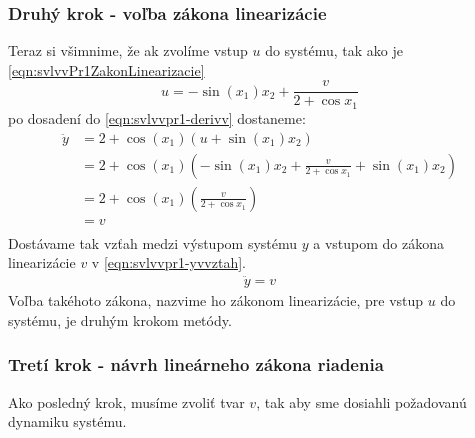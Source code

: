 \documentclass[../main.tex]{subfiles}
\begin{document}
    \subsubsection{Druhý krok - voľba zákona linearizácie}
	Teraz si všimnime, že ak zvolíme vstup $u$ do systému, tak ako je \cref{eqn:svlvvPr1ZakonLinearizacie} 
	\begin{equation}
	    u = -\sin(x_1) x_2  +  \frac{v}{2 + \cos x_1}
	    \label{eqn:svlvvPr1ZakonLinearizacie}
	\end{equation}
po dosadení do \cref{eqn:svlvvpr1-derivv} dostaneme:%
	\begin{equation*}
	\begin{aligned}
	 	\ddot{y} &= 2 + \cos(x_1)(u + \sin(x_1) x_2) \\
	 		     &= 2 + \cos(x_1)(-\sin(x_1) x_2  +  \frac{v}{2 + \cos x_1} + \sin(x_1) x_2)  \\ 
	 		     &= 2 + \cos(x_1)(\frac{v}{2 + \cos x_1})  \\ 
	 		     &= v  \\ 
 	\end{aligned}
	\end{equation*}
    Dostávame tak vzťah medzi výstupom systému $y$ a vstupom do zákona linearizácie $v$ v \cref{eqn:svlvvpr1-yvvztah}.
    \begin{equation}
        \begin{aligned}
            \ddot{y} = v
        \end{aligned}
        \label{eqn:svlvvpr1-yvvztah}
    \end{equation} 
     Voľba takéhoto zákona, nazvime ho zákonom linearizácie, pre vstup $u$ do systému, je druhým krokom metódy.

    \subsubsection{Tretí krok - návrh lineárneho zákona riadenia}
    Ako posledný krok, musíme zvoliť tvar $v$, tak aby sme dosiahli požadovanú dynamiku systému.
    
\end{document}
